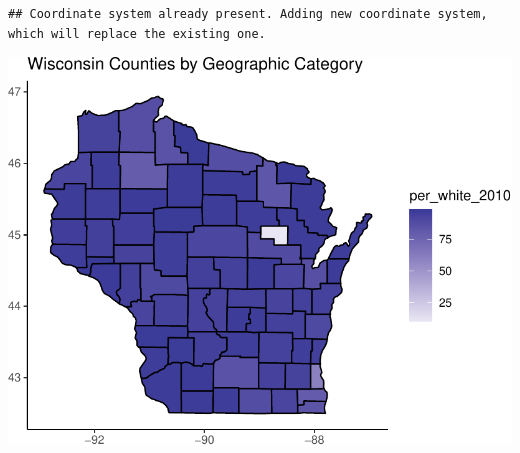 \documentclass[10pt,]{article}
\begin{document}
\begin{verbatim}
## Coordinate system already present. Adding new coordinate system, which will replace the existing one.
\end{verbatim}

\includegraphics{nchs_scratch_files/figure-latex/unnamed-chunk-13-1.pdf}





\newpage
\singlespacing 
\end{document}
